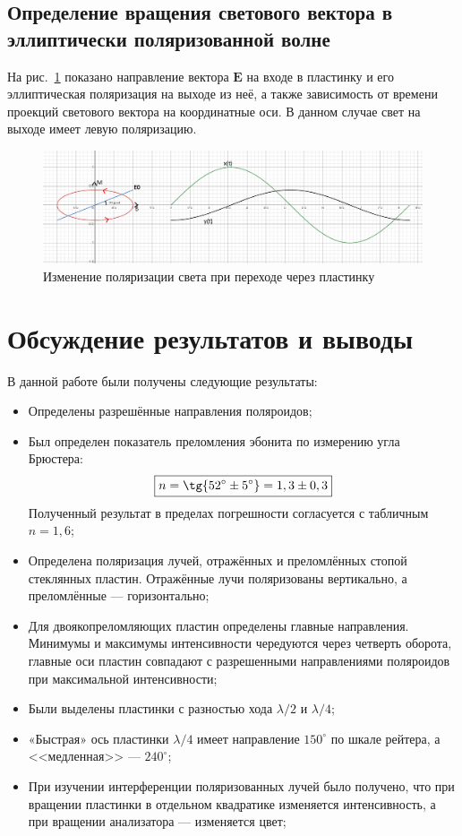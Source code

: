 \documentclass[a4paper, 12pt]{article}
\begin{document}
\newpage

\subsection{Определение вращения светового вектора в эллиптически поляризованной волне}

На рис.~\ref{fig:rotation} показано направление вектора $\mathbf{E}$ на входе в пластинку и его эллиптическая поляризация на выходе из неё, а также зависимость от времени проекций светового вектора на координатные оси. В данном случае свет на выходе имеет левую поляризацию.

\begin{figure}[h!]
\begin{center}
   \includegraphics[width=1.0\linewidth]{rotation.png}
\end{center}
\caption{Изменение поляризации света при переходе через пластинку}
\label{fig:rotation}
\end{figure}

\section{Обсуждение результатов и выводы}

В данной работе были получены следующие результаты:
\begin{itemize}
\item Определены разрешённые направления поляроидов;
\item Был определен показатель преломления эбонита по измерению угла Брюстера:
\begin{equation*}
    \boxed{n = \tg{52^{\circ}\pm5^{\circ}} = 1,3\pm0,3}
\end{equation*}
Полученный результат в пределах погрешности согласуется с табличным $n = 1,6$;
\item Определена поляризация лучей, отражённых и преломлённых стопой стеклянных пластин. Отражённые лучи поляризованы вертикально, а преломлённые --- горизонтально;
\item Для двоякопреломляющих пластин определены главные направления. Минимумы и
максимумы интенсивности чередуются через четверть оборота, главные оси пластин совпадают с разрешенными направлениями поляроидов при максимальной интенсивности;
\item Были выделены пластинки с разностью хода $\lambda/2$ и $\lambda/4$;
\item «Быстрая» ось пластинки $\lambda/4$ имеет направление $150^{\circ}$ по шкале рейтера, а <<медленная>> --- $240^{\circ}$;
\item При изучении интерференции поляризованных лучей было получено, что при вращении пластинки в отдельном квадратике изменяется интенсивность, а при вращении анализатора --- изменяется цвет;
\end{itemize}
\end{document}
